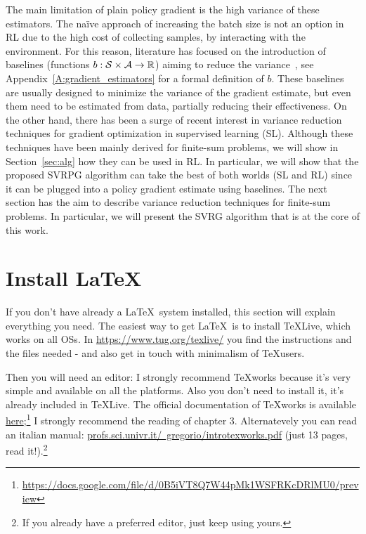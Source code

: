 The main limitation of plain policy gradient is the high variance of these estimators.
The na\"ive approach of increasing the batch size is not an option in RL due to the high cost of collecting samples, \ie by interacting with the environment.
For this reason, literature has focused on the introduction of baselines (\ie functions $b : \mathcal{S} \times \mathcal{A} \to \mathbb R$) aiming to reduce the variance~\citep[\eg][]{williams1992simple,Peters2008reinf,Thomas2017actionbaseline,wu2018variance}, see Appendix~\ref{A:gradient_estimators} for a formal definition of $b$.
These baselines are usually designed to minimize the variance of the gradient estimate, but even them need to be estimated from data, partially reducing their effectiveness.
On the other hand, there has been a surge of recent interest in variance reduction techniques for gradient optimization in supervised learning (SL).
Although these techniques have been mainly derived for finite-sum problems, we will show in Section~\ref{sec:alg} how they can be used in RL.
In particular, we will show that the proposed SVRPG algorithm can take the best of both worlds (\ie SL and RL) since it can be plugged into a policy gradient estimate using baselines.
The next section has the aim to describe variance reduction techniques for finite-sum problems. In particular, we will present the SVRG algorithm that is at the core of this work.


\vspace{-0.05in}
\section{Install \LaTeX}
If you don't have already a \LaTeX\ system installed, this section will explain everything you need.
The easiest way to get \LaTeX\ is to install TeXLive, which works on all \acp{OS}.
In \url{https://www.tug.org/texlive/} you find the instructions and the files needed - and also get in touch with minimalism of \TeX users. 

Then you will need an editor: I strongly recommend TeXworks because it's very simple and available on all the platforms.
Also you don't need to install it, it's already included in TeXLive.
The official documentation of TeXworks is available \href{https://docs.google.com/file/d/0B5iVT8Q7W44pMk1WSFRKcDRlMU0/preview}{here};\footnote{\url{https://docs.google.com/file/d/0B5iVT8Q7W44pMk1WSFRKcDRlMU0/preview}}
I strongly recommend the reading of chapter 3.
Alternatevely you can read an italian manual: \href{http://profs.sci.univr.it/~gregorio/introtexworks.pdf}{profs.sci.univr.it/~gregorio/introtexworks.pdf} (just 13 pages, read it!).\footnote{If you already have a preferred editor, just keep using yours.}

